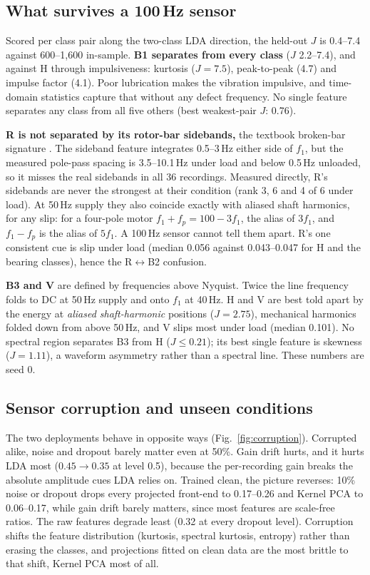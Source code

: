 \subsection{What survives a 100\,Hz sensor}\label{sec:separability}

Scored per class pair along the two-class LDA direction, the held-out $J$ is 0.4--7.4 against
600--1{,}600 in-sample. \textbf{B1 separates from every class} ($J$ 2.2--7.4), and against H
through impulsiveness: kurtosis ($J = 7.5$), peak-to-peak (4.7) and impulse factor (4.1). Poor
lubrication makes the vibration impulsive, and time-domain statistics capture that without any
defect frequency. No single feature separates any class from all five others (best weakest-pair $J$: 0.76).

\textbf{R is not separated by its rotor-bar sidebands,} the textbook broken-bar signature
\cite{nandi2005}. The sideband feature integrates
0.5--3\,Hz either side of $f_1$, but the measured pole-pass spacing is 3.5--10.1\,Hz under load
and below 0.5\,Hz unloaded, so it misses the real sidebands in all 36 recordings. Measured
directly, R's sidebands are never the strongest at their condition (rank 3, 6 and 4 of 6 under
load). At 50\,Hz supply they also coincide exactly with aliased shaft harmonics, for any slip:
for a four-pole motor $f_1 + f_p = 100 - 3f_1$, the alias of $3f_1$, and $f_1 - f_p$ is the alias
of $5f_1$. A 100\,Hz sensor cannot tell them apart. R's one consistent cue is slip under load
(median 0.056 against 0.043--0.047 for H and the bearing classes), hence the R$\leftrightarrow$B2
confusion.

\textbf{B3 and V} are defined by frequencies above Nyquist. Twice the line frequency folds to DC
at 50\,Hz supply and onto $f_1$ at 40\,Hz. H and V are best told apart by the energy at
\emph{aliased shaft-harmonic} positions ($J = 2.75$), mechanical harmonics folded down from above
50\,Hz, and V slips most under load (median 0.101). No spectral region separates B3 from H
($J \le 0.21$); its best single feature is skewness ($J = 1.11$), a waveform asymmetry rather
than a spectral line. These numbers are seed 0.

\subsection{Sensor corruption and unseen conditions}

The two deployments behave in opposite ways (Fig.~\ref{fig:corruption}). Corrupted alike,
noise and dropout barely matter even at 50\%. Gain drift hurts, and it hurts LDA most ($0.45 \to 0.35$ at level 0.5), because
the per-recording gain breaks the absolute amplitude cues LDA relies on. Trained clean, the
picture reverses: 10\% noise or dropout drops every projected front-end to 0.17--0.26 and Kernel
PCA to 0.06--0.17, while gain drift barely matters, since most features are scale-free ratios.
The raw features degrade least (0.32 at every dropout level). Corruption shifts the feature distribution (kurtosis, spectral kurtosis, entropy) rather than
erasing the classes, and projections fitted on clean data are the most
brittle to that shift, Kernel PCA most of all.

